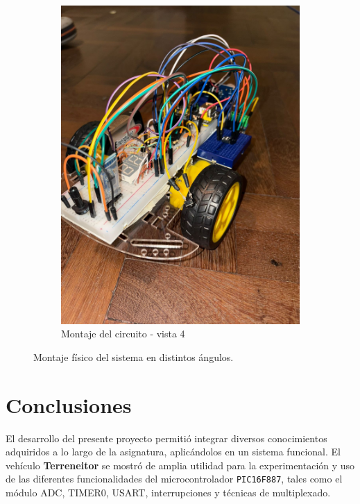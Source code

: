 \documentclass[]{article}
\begin{document}
\begin{figure}[h!]
\begin{subfigure}[b]{0.45\textwidth}
			\includegraphics[width=\linewidth]{Figuras/montaje_4}
			\caption{Montaje del circuito - vista 4}
			\label{fig:montaje4}
		\end{subfigure}
		
		\caption{Montaje físico del sistema en distintos ángulos.}
		\label{fig:montaje_completo}
	\end{figure}
	
	\section{Conclusiones}
	
	El desarrollo del presente proyecto permitió integrar diversos conocimientos adquiridos a lo largo de la asignatura, aplicándolos en un sistema funcional. El vehículo \textbf{Terreneitor} se mostró de amplia utilidad para la experimentación y uso de las diferentes funcionalidades del microcontrolador \texttt{PIC16F887}, tales como el módulo ADC, TIMER0, USART, interrupciones y técnicas de multiplexado.
	
\end{document}
